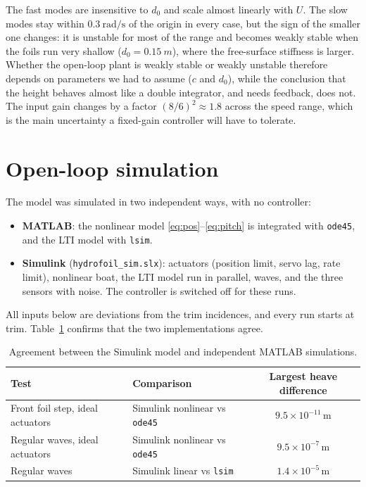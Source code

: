 \documentclass[11pt,a4paper]{article}
\begin{document}
The fast modes are insensitive to $d_0$ and scale almost linearly with $U$. The
slow modes stay within $0.3\ \mathrm{rad/s}$ of the origin in every case, but the
sign of the smaller one changes: it is unstable for most of the range and becomes
weakly stable when the foils run very shallow ($d_0=\SI{0.15}{m}$), where the
free-surface stiffness is larger. Whether the open-loop plant is weakly stable or
weakly unstable therefore depends on parameters we had to assume ($c$ and $d_0$),
while the conclusion that the height behaves almost like a double integrator, and
needs feedback, does not. The input gain changes by a factor
$(8/6)^2\approx1.8$ across the speed range, which is the main uncertainty a
fixed-gain controller will have to tolerate.

\section{Open-loop simulation}
\label{sec:sim}

The model was simulated in two independent ways, with no controller:
\begin{itemize}
\item \textbf{MATLAB}: the nonlinear model \eqref{eq:pos}--\eqref{eq:pitch} is
      integrated with \texttt{ode45}, and the LTI model with \texttt{lsim}.
\item \textbf{Simulink} (\texttt{hydrofoil\_sim.slx}): actuators (position limit,
      servo lag, rate limit), nonlinear boat, the LTI model run in parallel, waves,
      and the three sensors with noise. The controller is switched off for these
      runs.
\end{itemize}
All inputs below are deviations from the trim incidences, and every run starts
at trim. Table~\ref{tab:simcheck} confirms that the two implementations agree.

\begin{table}[htbp]
\centering
\caption{Agreement between the Simulink model and independent MATLAB simulations.}
\label{tab:simcheck}
\begin{tabular}{@{}llc@{}}
\toprule
Test & Comparison & Largest heave difference \\ \midrule
Front foil step, ideal actuators & Simulink nonlinear vs \texttt{ode45} & $9.5\times10^{-11}$\,m \\
Regular waves, ideal actuators & Simulink nonlinear vs \texttt{ode45} & $9.5\times10^{-7}$\,m \\
Regular waves & Simulink linear vs \texttt{lsim} & $1.4\times10^{-5}$\,m \\
\bottomrule
\end{tabular}
\end{table}
\end{document}
